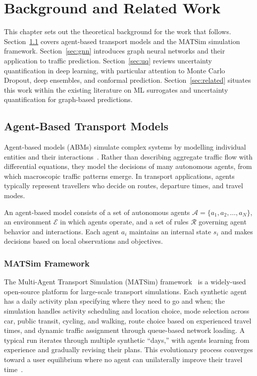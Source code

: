 
\chapter{Background and Related Work}\label{chapter:background}

This chapter sets out the theoretical background for the work that follows. Section~\ref{sec:abm} covers agent-based transport models and the MATSim simulation framework. Section~\ref{sec:gnn} introduces graph neural networks and their application to traffic prediction. Section~\ref{sec:uq} reviews uncertainty quantification in deep learning, with particular attention to Monte Carlo Dropout, deep ensembles, and conformal prediction. Section~\ref{sec:related} situates this work within the existing literature on ML surrogates and uncertainty quantification for graph-based predictions.

\section{Agent-Based Transport Models}\label{sec:abm}

Agent-based models (ABMs) simulate complex systems by modelling individual entities and their interactions~\cite{bonabeau2002agent, railsback2019agent}. Rather than describing aggregate traffic flow with differential equations, they model the decisions of many autonomous agents, from which macroscopic traffic patterns emerge. In transport applications, agents typically represent travellers who decide on routes, departure times, and travel modes.

\begin{definition}
An agent-based model consists of a set of autonomous agents $\mathcal{A} = \{a_1, a_2, \ldots, a_N\}$, an environment $\mathcal{E}$ in which agents operate, and a set of rules $\mathcal{R}$ governing agent behavior and interactions. Each agent $a_i$ maintains an internal state $s_i$ and makes decisions based on local observations and objectives.
\end{definition}

\subsection{MATSim Framework}

The Multi-Agent Transport Simulation (MATSim) framework~\cite{horni2016matsim} is a widely-used open-source platform for large-scale transport simulations. Each synthetic agent has a daily activity plan specifying where they need to go and when; the simulation handles activity scheduling and location choice, mode selection across car, public transit, cycling, and walking, route choice based on experienced travel times, and dynamic traffic assignment through queue-based network loading. A typical run iterates through multiple synthetic ``days,'' with agents learning from experience and gradually revising their plans. This evolutionary process converges toward a user equilibrium where no agent can unilaterally improve their travel time~\cite{horni2016matsim}.

